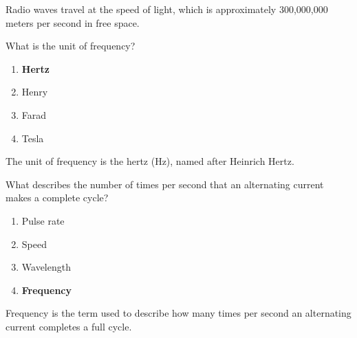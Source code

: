 Radio waves travel at the speed of light, which is approximately 300,000,000 meters per second in free space.

\begin{tcolorbox}[colback=gray!10!white,colframe=black!75!black,title={T5A06}]
What is the unit of frequency?
\begin{enumerate}[label=\Alph*),noitemsep]
    \item \textbf{Hertz}
    \item Henry
    \item Farad
    \item Tesla
\end{enumerate}
\end{tcolorbox}

The unit of frequency is the hertz (Hz), named after Heinrich Hertz.

\begin{tcolorbox}[colback=gray!10!white,colframe=black!75!black,title={T5A12}]
What describes the number of times per second that an alternating current makes a complete cycle?
\begin{enumerate}[label=\Alph*),noitemsep]
    \item Pulse rate
    \item Speed
    \item Wavelength
    \item \textbf{Frequency}
\end{enumerate}
\end{tcolorbox}

Frequency is the term used to describe how many times per second an alternating current completes a full cycle.
